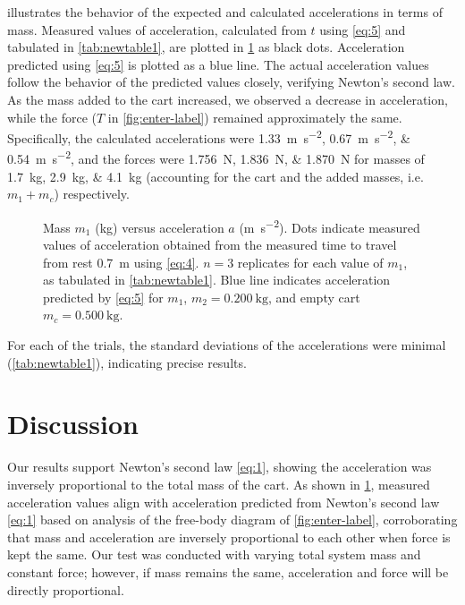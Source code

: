 \documentclass[reprint,amsmath,amssymb,aps]{revtex4-2}
\begin{document}
 illustrates the behavior of the expected and calculated accelerations in terms of mass. Measured values of acceleration, calculated from $t$ using \cref{eq:5} and tabulated in \ref{tab:newtable1}, are plotted in \cref{fig:graph of acceleration} as black dots. Acceleration predicted using \cref{eq:5} is plotted as a blue line. The actual acceleration values follow the behavior of the predicted values closely, verifying Newton's second law. As the mass added to the cart increased, we observed a decrease in acceleration, while the force ($T$ in \cref{fig:enter-label}) remained approximately the same. Specifically, the calculated accelerations were \qtylist{1.33;0.67;0.54}{\meter\per\second\squared}, and the forces were \qtylist{1.756;1.836;1.870}{\newton} for masses of \qtylist{1.7;2.9;4.1}{\kilo\gram} (accounting for the cart and the added masses, i.e. $m_1+m_c$) respectively. 

\begin{figure}[ht] %
\begin{center}

\end{center}
\caption{\label{fig:graph of acceleration} Mass $m_1$ (\unit{\kilo\gram}) versus acceleration $a$ (\unit{\meter\per\second\squared}). Dots indicate measured values of acceleration obtained from the measured time to travel from rest \qty{0.7}{\meter} using \cref{eq:4}. $n=3$ replicates for each value of $m_1$, as tabulated in \cref{tab:newtable1}. Blue line indicates acceleration predicted by \cref{eq:5} for $m_1$, $m_2=\qty{0.200}{\kilo\gram}$, and empty cart $m_c=\qty{0.500}{\kilo\gram}$.}
\end{figure}

For each of the trials, the standard deviations of the accelerations were minimal (\cref{tab:newtable1}), indicating precise results. 





\section{Discussion}
Our results support Newton's second law \cref{eq:1}, showing the acceleration was inversely proportional to the total mass of the cart. As shown in \cref{fig:graph of acceleration}, measured acceleration values align with acceleration predicted from Newton's second law \cref{eq:1} based on analysis of the free-body diagram of \cref{fig:enter-label}, corroborating that mass and acceleration are inversely proportional to each other when force is kept the same. Our test was conducted with varying total system mass and constant force; however, if mass remains the same, acceleration and force will be directly proportional. 
\end{document}
